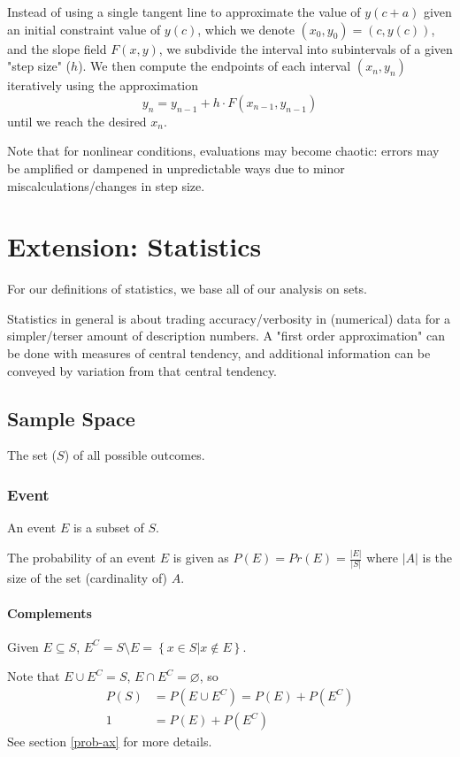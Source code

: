 \documentclass{article}
\begin{document}
Instead of using a single tangent line to approximate the value of $y(c+a)$ given an initial constraint value of $y(c)$, which we denote $(x_0,y_0)=(c,y(c))$, and the slope field $F(x,y)$, we subdivide the interval into subintervals of a given "step size" ($h$).  We then compute the endpoints of each interval $(x_n,y_n)$ iteratively using the approximation $$y_n=y_{n-1}+h\cdot F\left(x_{n-1},y_{n-1}\right)$$ until we reach the desired $x_n$.

Note that for nonlinear conditions, evaluations may become chaotic: errors may be amplified or dampened in unpredictable ways due to minor miscalculations/changes in step size.

\section{Extension: Statistics}
For our definitions of statistics, we base all of our analysis on sets.

Statistics in general is about trading accuracy/verbosity in (numerical) data for a simpler/terser amount of description numbers. A "first order approximation" can be done with measures of central tendency, and additional information can be conveyed by variation from that central tendency.

\subsection{Sample Space}
The set ($S$) of all possible outcomes.
\subsubsection{Event} An event $E$ is a subset of $S$.

The probability of an event $E$ is given as $P(E)=Pr(E)=\frac{|E|}{|S|}$ where $|A|$ is the size of the set (cardinality of) $A$.

\paragraph{Complements}
Given $E \subseteq S$, $E^C= S \setminus E = \left\{x \in S | x \notin E\right\}$.

Note that $E \cup E^C = S$, $E \cap E^C = \varnothing$, so
\begin{align*}
    P(S) &= P(E \cup E^C) = P(E) + P(E^C) \\
    1 &= P(E) + P(E^C)
\end{align*}
See section \ref{prob-ax} for more details.
\end{document}
